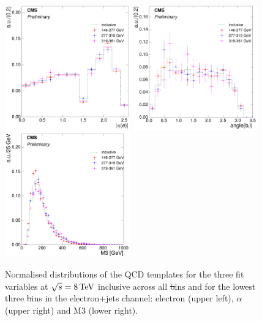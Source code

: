 \begin{figure}[hbtp]
    \centering
     \includegraphics[width=0.48\textwidth]{Chapters/04_Analysis/04b_XSections/images/8TeV/fit_variables/electron/ST/electron_absolute_eta/qcd/ST_electron_absolute_eta_0orMoreBtag_QCD_template_comparison.pdf}\hfill
     \includegraphics[width=0.48\textwidth]{Chapters/04_Analysis/04b_XSections/images/8TeV/fit_variables/electron/ST/angle_bl/qcd/ST_angle_bl_1orMoreBtag_QCD_template_comparison.pdf}\\
     \includegraphics[width=0.48\textwidth]{Chapters/04_Analysis/04b_XSections/images/8TeV/fit_variables/electron/ST/M3/qcd/ST_M3_0orMoreBtag_QCD_template_comparison.pdf}\\
	 \caption{Normalised distributions of the QCD templates for the three fit variables at $\sqrt{s}=8\,\text{Te\hspace{-.08em}V}$
	 inclusive across all \st bins and for the lowest three \st bins in the electron+jets channel: electron
	 \abseta (upper left), $\alpha$ (upper right) and M3 (lower right).}
     \label{fig:ST_fit_variable_qcd_comparisons_electron_8TeV}
\end{figure}

